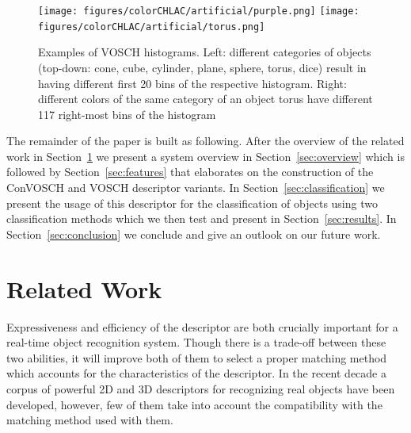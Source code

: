 \documentclass[conference]{sty/IEEEtran}
\begin{document}
\begin{figure}[htb!]
  \begin{center}
    \texttt{[image: figures/colorCHLAC/artificial/purple.png]}
    \texttt{[image: figures/colorCHLAC/artificial/torus.png]}
    \caption{Examples of  VOSCH histograms.
Left: different categories of objects (top-down: cone, cube, cylinder, plane, sphere, torus, dice) 
result in having different first 20 bins of the respective histogram.
Right: different colors of the same category of an object torus have different 117 right-most bins of the histogram}
    \label{fig:grsd_cchlac}
  \end{center}
\end{figure}

The remainder of the paper is built as following. After the overview of the related
work in Section~\ref{sec:rl} we present a system overview in Section~\ref{sec:overview}
which is followed by Section~\ref{sec:features} that elaborates on the construction of the
ConVOSCH and VOSCH descriptor variants. In Section~\ref{sec:classification} we present the usage of this descriptor
for the classification of objects using two classification methods which we
then test and present in Section~\ref{sec:results}. In Section~\ref{sec:conclusion}
we conclude and give an outlook on our future work.

\section{Related Work}
\label{sec:rl}
Expressiveness and efficiency of the descriptor are both crucially important for
a real-time object recognition system.  Though there is a trade-off between
these two abilities, it will improve both of them to select a
proper matching method which accounts for the characteristics of the
descriptor. In the recent decade a corpus of powerful 2D and 3D descriptors for
recognizing real objects have been developed, however, few of them take into
account the compatibility with the matching method used with them.
\end{document}
